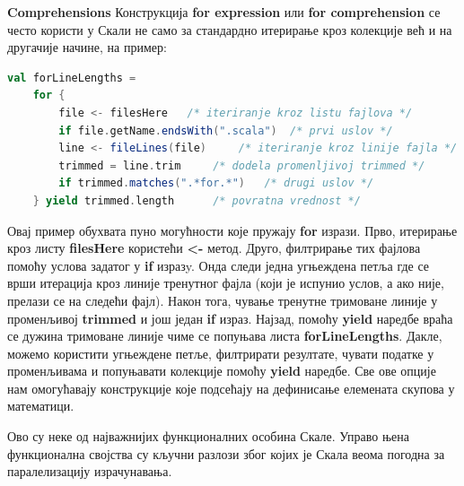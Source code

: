 \documentclass[12pt,oneside]{memoir}
\begin{document}
\begin{description}
\item \textbf{Comprehensions}
Конструкција \textbf{for expression} или \textbf{for comprehension} се често користи у Скали не само за стандардно итерирање кроз колекције већ и на другачије начине, на пример:
\begin{lstlisting}[language=Scala]
val forLineLengths =
	for {
		file <- filesHere 	/* iteriranje kroz listu fajlova */
		if file.getName.endsWith(".scala") 	/* prvi uslov */
		line <- fileLines(file) 	/* iteriranje kroz linije fajla */
		trimmed = line.trim 	/* dodela promenljivoj trimmed */
		if trimmed.matches(".*for.*") 	/* drugi uslov */
	} yield trimmed.length 		/* povratna vrednost */
\end{lstlisting}
Овај пример обухвата пуно могућности које пружају \textbf{for} изрази. Прво, итерирање кроз листу \textbf{filesHere} користећи \textbf{<-} метод. Друго, филтрирање тих фајлова помоћу услова задатог у \textbf{if} изразy. Онда следи једна угњеждена петља где се врши итерација кроз линије тренутног фајла (који је испунио услов, а ако није, прелази се на следећи фајл). Након тога, чување тренутне тримоване линије у променљивој \textbf{trimmed} и још један \textbf{if} израз. Најзад, помоћу \textbf{yield} наредбе враћа се дужина тримоване линије чиме се попуњава листа \textbf{forLineLengths}. Дакле, можемо користити угњеждене петље, филтрирати резултате, чувати податке у променљивама и попуњавати колекције помоћу \textbf{yield} наредбе. Све ове опције нам омогућавају конструкције које подсећају на дефинисање елемената скупова у математици.
\end{description}

\par Ово су неке од најважнијих функционалних особина Скале. Управо њена функционална својства су кључни разлози због којих је Скала веома погодна за паралелизацију израчунавања. 

\end{document}
